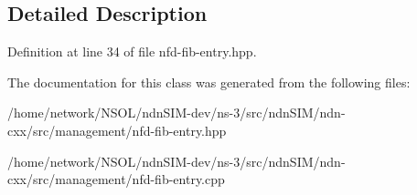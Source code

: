 \subsection{Detailed Description}


Definition at line 34 of file nfd-\/fib-\/entry.\+hpp.



The documentation for this class was generated from the following files\+:\begin{DoxyCompactItemize}
\item 
/home/network/\+N\+S\+O\+L/ndn\+S\+I\+M-\/dev/ns-\/3/src/ndn\+S\+I\+M/ndn-\/cxx/src/management/nfd-\/fib-\/entry.\+hpp\item 
/home/network/\+N\+S\+O\+L/ndn\+S\+I\+M-\/dev/ns-\/3/src/ndn\+S\+I\+M/ndn-\/cxx/src/management/nfd-\/fib-\/entry.\+cpp\end{DoxyCompactItemize}
